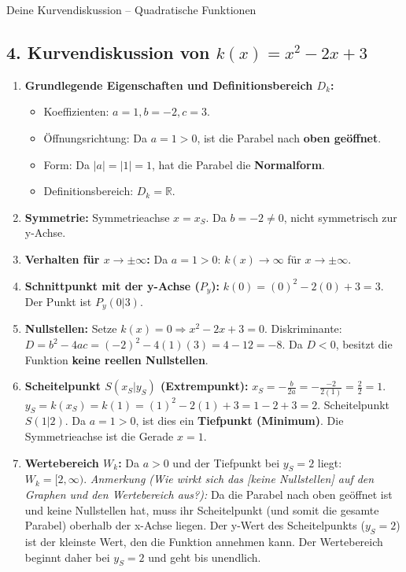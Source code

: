 \begin{loesungsumgebung}{Deine Kurvendiskussion – Quadratische Funktionen}
\subsection*{4. Kurvendiskussion von $k(x) = x^2 - 2x + 3$}
\begin{enumerate}[label=(\alph*)]
    \item \textbf{Grundlegende Eigenschaften und Definitionsbereich $D_k$:}
    \begin{itemize}
        \item Koeffizienten: $a=1, b=-2, c=3$.
        \item Öffnungsrichtung: Da $a=1 > 0$, ist die Parabel nach \textbf{oben geöffnet}.
        \item Form: Da $|a|=|1|=1$, hat die Parabel die \textbf{Normalform}.
        \item Definitionsbereich: $D_k = \mathbb{R}$.
    \end{itemize}
    \item \textbf{Symmetrie:}
    Symmetrieachse $x = x_S$. Da $b=-2 \neq 0$, nicht symmetrisch zur y-Achse.
    \item \textbf{Verhalten für $x \to \pm \infty$:}
    Da $a=1 > 0$: $k(x) \to \infty$ für $x \to \pm \infty$.
    \item \textbf{Schnittpunkt mit der y-Achse ($P_y$):}
    $k(0) = (0)^2 - 2(0) + 3 = 3$. Der Punkt ist $P_y(0|3)$.
    \item \textbf{Nullstellen:}
    Setze $k(x)=0 \Rightarrow x^2 - 2x + 3 = 0$.
    Diskriminante: $D = b^2 - 4ac = (-2)^2 - 4(1)(3) = 4 - 12 = -8$.
    Da $D < 0$, besitzt die Funktion \textbf{keine reellen Nullstellen}.
    \item \textbf{Scheitelpunkt $S(x_S|y_S)$ (Extrempunkt):}
    $x_S = -\frac{b}{2a} = -\frac{-2}{2(1)} = \frac{2}{2} = 1$.
    $y_S = k(x_S) = k(1) = (1)^2 - 2(1) + 3 = 1 - 2 + 3 = 2$.
    Scheitelpunkt $S(1|2)$. Da $a=1 > 0$, ist dies ein \textbf{Tiefpunkt (Minimum)}.
    Die Symmetrieachse ist die Gerade $x=1$.
    \item \textbf{Wertebereich $W_k$:}
    Da $a>0$ und der Tiefpunkt bei $y_S=2$ liegt: $W_k = [2, \infty)$.
    \textit{Anmerkung (Wie wirkt sich das [keine Nullstellen] auf den Graphen und den Wertebereich aus?):} Da die Parabel nach oben geöffnet ist und keine Nullstellen hat, muss ihr Scheitelpunkt (und somit die gesamte Parabel) oberhalb der x-Achse liegen. Der y-Wert des Scheitelpunkts ($y_S=2$) ist der kleinste Wert, den die Funktion annehmen kann. Der Wertebereich beginnt daher bei $y_S=2$ und geht bis unendlich.
\end{enumerate}


\end{loesungsumgebung}
